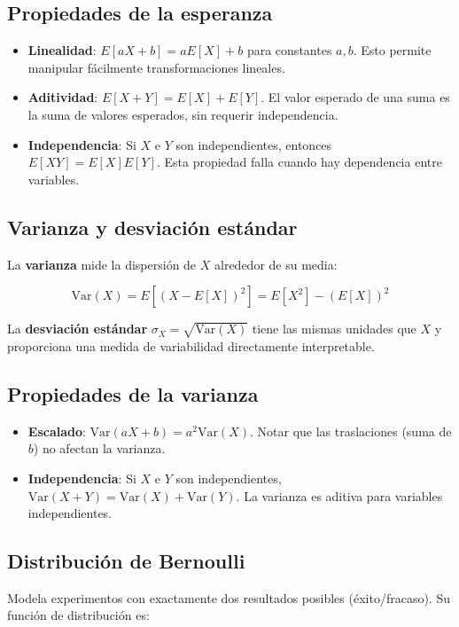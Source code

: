 \documentclass[letterpaper, 12pt]{article}
\begin{document}
	\subsection{Propiedades de la esperanza}
	\begin{itemize}
		\item \textbf{Linealidad}: $E[aX + b] = aE[X] + b$ para constantes $a,b$. Esto permite manipular fácilmente transformaciones lineales.
		
		\item \textbf{Aditividad}: $E[X + Y] = E[X] + E[Y]$. El valor esperado de una suma es la suma de valores esperados, sin requerir independencia.
		
		\item \textbf{Independencia}: Si $X$ e $Y$ son independientes, entonces $E[XY] = E[X]E[Y]$. Esta propiedad falla cuando hay dependencia entre variables.
	\end{itemize}
	
	\subsection{Varianza y desviación estándar}
	La \textbf{varianza} mide la dispersión de $X$ alrededor de su media:
	
	\[ \text{Var}(X) = E[(X - E[X])^2] = E[X^2] - (E[X])^2 \]
	
	La \textbf{desviación estándar} $\sigma_X = \sqrt{\text{Var}(X)}$ tiene las mismas unidades que $X$ y proporciona una medida de variabilidad directamente interpretable.
	
	\subsection{Propiedades de la varianza}
	\begin{itemize}
		\item \textbf{Escalado}: $\text{Var}(aX + b) = a^2 \text{Var}(X)$. Notar que las traslaciones (suma de $b$) no afectan la varianza.
		
		\item \textbf{Independencia}: Si $X$ e $Y$ son independientes, $\text{Var}(X + Y) = \text{Var}(X) + \text{Var}(Y)$. La varianza es aditiva para variables independientes.
	\end{itemize}
	
	\subsection{Distribución de Bernoulli}
	Modela experimentos con exactamente dos resultados posibles (éxito/fracaso). Su función de distribución es:
	
\end{document}
